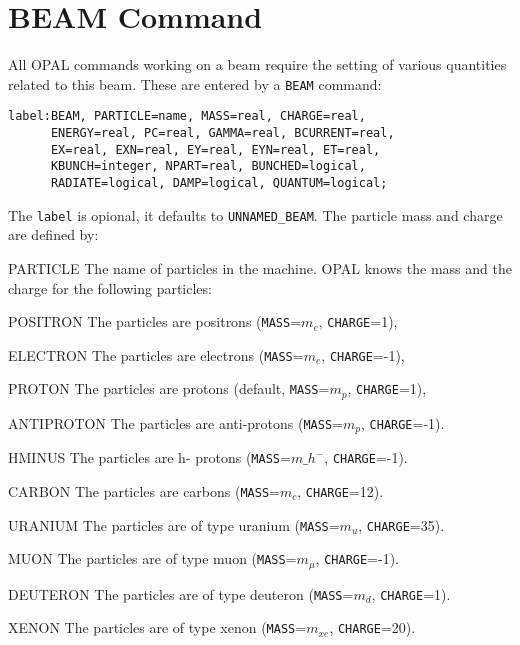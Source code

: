 \section{BEAM Command}
\label{sec:beam}
All OPAL commands working on a beam require the setting of various
quantities related to this beam. 
These are entered by a \texttt{BEAM} command:
\begin{verbatim}
label:BEAM, PARTICLE=name, MASS=real, CHARGE=real,
      ENERGY=real, PC=real, GAMMA=real, BCURRENT=real,
      EX=real, EXN=real, EY=real, EYN=real, ET=real,
      KBUNCH=integer, NPART=real, BUNCHED=logical,
      RADIATE=logical, DAMP=logical, QUANTUM=logical;
\end{verbatim}
The \texttt{label} is opional, it defaults to \texttt{UNNAMED\_BEAM}.
The particle mass and charge are defined by:
\begin{description}
\item{PARTICLE}
  The name of particles in the machine.
  OPAL knows the mass and the charge for the following particles:
  \begin{description}
  \item{POSITRON}
    The particles are positrons (\texttt{MASS}=$m_e$,
    \texttt{CHARGE}=1),
  \item{ELECTRON}
    The particles are electrons (\texttt{MASS}=$m_e$,
    \texttt{CHARGE}=-1),
  \item{PROTON}
    The particles are protons (default, \texttt{MASS}=$m_p$,
    \texttt{CHARGE}=1),
  \item{ANTIPROTON}
    The particles are anti-protons (\texttt{MASS}=$m_p$,
    \texttt{CHARGE}=-1).

    \item {HMINUS}
    The particles are h- protons (\texttt{MASS}=$m\_{h^{-}}$,
    \texttt{CHARGE}=-1).
    
    \item{CARBON}
    The particles are carbons (\texttt{MASS}=$m_c$,
    \texttt{CHARGE}=12).
    
      \item{URANIUM}
    The particles are of type uranium (\texttt{MASS}=$m_u$,
    \texttt{CHARGE}=35).
         
         \item{MUON}
    The particles are of type muon (\texttt{MASS}=$m_\mu$,
    \texttt{CHARGE}=-1).

   \item{DEUTERON}
    The particles are of type deuteron (\texttt{MASS}=$m_d$,
    \texttt{CHARGE}=1).
    
      \item{XENON}
    The particles are of type xenon (\texttt{MASS}=$m_{xe}$,
    \texttt{CHARGE}=20).
       
  \end{description}
\end{description}
